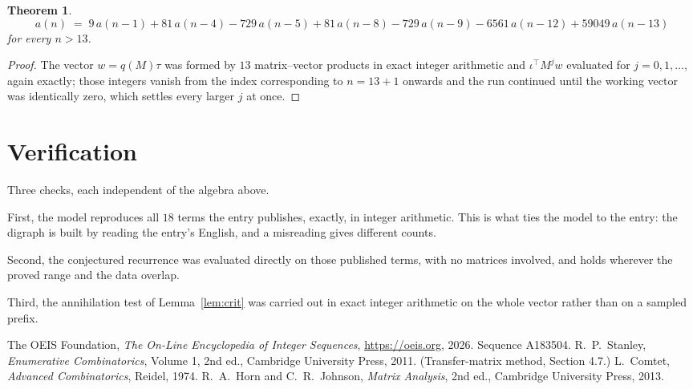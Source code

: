 \documentclass[11pt,a4paper]{article}
\theoremstyle{plain}
\newtheorem{theorem}{Theorem}
\theoremstyle{definition}
\begin{document}
\begin{theorem}
\[
a(n)\;=\;9\,a(n-1) + 81\,a(n-4) - 729\,a(n-5) + 81\,a(n-8) - 729\,a(n-9) - 6561\,a(n-12) + 59049\,a(n-13)
\]
for every $n>13$.
\end{theorem}

\begin{proof}
The vector $w=q(M)\tau$ was formed by $13$ matrix--vector products in exact integer
arithmetic and $\iota^{\!\top}M^{j}w$ evaluated for $j=0,1,\dots$, again exactly; those
integers vanish from the index corresponding to $n=13+1$ onwards and the run continued
until the working vector was identically zero, which settles every larger $j$ at once.
\end{proof}

\section{Verification}

Three checks, each independent of the algebra above.

First, the model reproduces all $18$ terms the entry publishes, exactly, in integer
arithmetic. This is what ties the model to the entry: the digraph is built by reading the
entry's English, and a misreading gives different counts.

Second, the conjectured recurrence was evaluated directly on those published terms, with no
matrices involved, and holds wherever the proved range and the data overlap.

Third, the annihilation test of Lemma~\ref{lem:crit} was carried out in exact integer
arithmetic on the whole vector rather than on a sampled prefix.

\begin{thebibliography}{9}
 The OEIS Foundation, \emph{The On-Line Encyclopedia of Integer
Sequences}, \url{https://oeis.org}, 2026. Sequence A183504.
 R.~P.~Stanley, \emph{Enumerative Combinatorics}, Volume 1, 2nd ed.,
Cambridge University Press, 2011. (Transfer-matrix method, Section 4.7.)
 L.~Comtet, \emph{Advanced Combinatorics}, Reidel, 1974.
 R.~A.~Horn and C.~R.~Johnson, \emph{Matrix Analysis}, 2nd ed., Cambridge
University Press, 2013.
\end{thebibliography}
\end{document}
